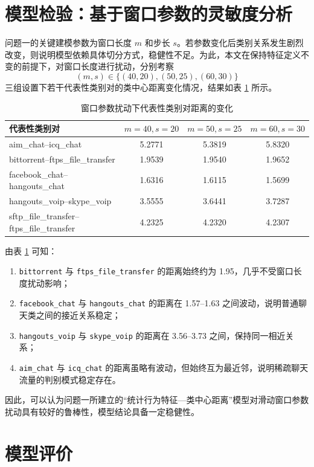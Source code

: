 \documentclass[UTF8,a4paper,12pt]{ctexart}
\begin{document}
\section{模型检验：基于窗口参数的灵敏度分析}

问题一的关键建模参数为窗口长度 $m$ 和步长 $s$。若参数变化后类别关系发生剧烈改变，则说明模型依赖具体切分方式，稳健性不足。为此，本文在保持特征定义不变的前提下，对窗口长度进行扰动，分别考察
\[
(m,s)\in\{(40,20),(50,25),(60,30)\}
\]
三组设置下若干代表性类别对的类中心距离变化情况，结果如表 \ref{tab:sens} 所示。

\begin{table}[H]
\centering
\caption{窗口参数扰动下代表性类别对距离的变化}
\label{tab:sens}
\begin{tabular}{lccc}
\toprule
代表性类别对 & $m=40,s=20$ & $m=50,s=25$ & $m=60,s=30$ \\
\midrule
aim\_chat--icq\_chat & 5.2771 & 5.3819 & 5.8320 \\
bittorrent--ftps\_file\_transfer & 1.9539 & 1.9540 & 1.9652 \\
facebook\_chat--hangouts\_chat & 1.6316 & 1.6115 & 1.5699 \\
hangouts\_voip--skype\_voip & 3.5555 & 3.6441 & 3.7287 \\
sftp\_file\_transfer--ftps\_file\_transfer & 4.2325 & 4.2320 & 4.2307 \\
\bottomrule
\end{tabular}
\end{table}

由表 \ref{tab:sens} 可知：

\begin{enumerate}[label=(\arabic*)]
    \item \texttt{bittorrent} 与 \texttt{ftps\_file\_transfer} 的距离始终约为 1.95，几乎不受窗口长度扰动影响；
    \item \texttt{facebook\_chat} 与 \texttt{hangouts\_chat} 的距离在 1.57--1.63 之间波动，说明普通聊天类之间的接近关系稳定；
    \item \texttt{hangouts\_voip} 与 \texttt{skype\_voip} 的距离在 3.56--3.73 之间，保持同一相近关系；
    \item \texttt{aim\_chat} 与 \texttt{icq\_chat} 的距离虽略有波动，但始终互为最近邻，说明稀疏聊天流量的判别模式稳定存在。
\end{enumerate}

因此，可以认为问题一所建立的“统计行为特征—类中心距离”模型对滑动窗口参数扰动具有较好的鲁棒性，模型结论具备一定稳健性。

\section{模型评价}
\end{document}
